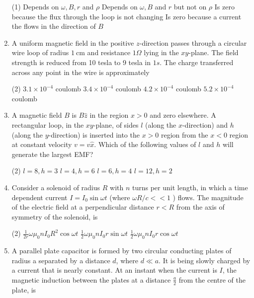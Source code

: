 \begin{enumerate}
\begin{figure}[H]
	\end{figure}
	\begin{tasks}(1)
		\task[\textbf{A.}] Depends on $\omega, B, r$ and $\rho$
		\task[\textbf{B.}] Depends on $\omega, B$ and $r$ but not on $\rho$
		\task[\textbf{C.}]  Is zero because the flux through the loop is not changing
		\task[\textbf{D.}] Is zero because a current the flows in the direction of $B$
	\end{tasks}	
	\item A uniform magnetic field in the positive $z$-direction passes through a circular wire loop of radius $1 \mathrm{~cm}$ and resistance $1 \Omega$ lying in the $x y$-plane. The field strength is reduced from 10 tesla to 9 tesla in $1 s$. The charge transferred across any point in the wire is approximately
	{}
	\begin{tasks}(2)
		\task[\textbf{a.}] $3.1 \times 10^{-4}$ coulomb
		\task[\textbf{b.}]$3.4 \times 10^{-4}$ coulomb
		\task[\textbf{c.}]$4.2 \times 10^{-4}$ coulomb
		\task[\textbf{d.}] $5.2 \times 10^{-4}$ coulomb
	\end{tasks}	
	\item A magnetic field $B$ is $B \hat{z}$ in the region $x>0$ and zero elsewhere. A rectangular loop, in the $x y$-plane, of sides $l$ (along the $x$-direction) and $h$ (along the $y$-direction) is inserted into the $x>0$ region from the $x<0$ region at constant velocity $v=v \hat{x}$. Which of the following values of $l$ and $h$ will generate the largest EMF?
	{}
	\begin{tasks}(2)
		\task[\textbf{a.}] $l=8, h=3$
		\task[\textbf{b.}]$l=4, h=6$
		\task[\textbf{c.}]$l=6, h=4$
		\task[\textbf{d.}]  $l=12, h=2$
	\end{tasks}	
	\item Consider a solenoid of radius $R$ with $n$ turns per unit length, in which a time dependent current $I=I_{0} \sin \omega t$ (where $\omega R / c<<1$ ) flows. The magnitude of the electric field at a perpendicular distance $r<R$ from the axis of symmetry of the solenoid, is
	{}
	\begin{tasks}(2)
		\task[\textbf{b.}]$\frac{1}{2 r} \omega \mu_{0} n I_{0} R^{2} \cos \omega t$
		\task[\textbf{c.}]$\frac{1}{2} \omega \mu_{0} n I_{0} r \sin \omega t$
		\task[\textbf{d.}]  $\frac{1}{2} \omega \mu_{0} n I_{0} r \cos \omega t$
	\end{tasks}	
	\item A parallel plate capacitor is formed by two circular conducting plates of radius a separated by a distance $d$, where $d \ll a$. It is being slowly charged by a current that is nearly constant. At an instant when the current is $I$, the magnetic induction between the plates at a distance $\frac{a}{2}$ from the centre of the plate, is

\end{enumerate}
